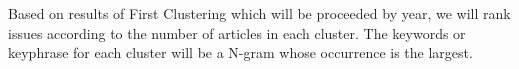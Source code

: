 Based on results of First Clustering which will be proceeded by year, we will rank issues according to the number of articles in each cluster. The keywords or keyphrase for each cluster will be a N-gram whose occurrence is the largest.